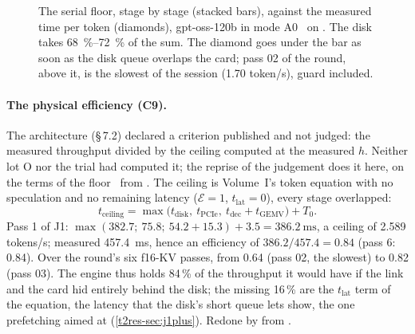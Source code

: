 \begin{figure}[ht]
\centering
\GrapheResPlancher
\caption[The serial floor, stage by stage]{The serial floor, stage by stage (stacked bars), against the measured time per token (diamonds), gpt-oss-120b in mode A0 \calc~on \mes. The disk takes \SIrange{68}{72}{\percent} of the sum. The diamond goes under the bar as soon as the disk queue overlaps the card; pass 02 of the round, above it, is the slowest of the session (\num{1.70} token/s), guard included.}
\label{t2res-fig:plancher}
\end{figure}

\paragraph{The physical efficiency (C9).}\label{t2res-sec:c9} The architecture (§\,7.2) declared a criterion published and not judged: the measured throughput divided by the ceiling computed at the measured $h$. Neither lot O nor the trial had computed it; the reprise of the judgement does it here, on the terms of the floor \calc~from \mes. The ceiling is Volume~I's token equation with no speculation and no remaining latency ($\mathcal E = 1$, $t_{\text{lat}} = 0$), every stage overlapped:
\[
t_{\text{ceiling}} = \max\big(t_{\text{disk}},\ t_{\text{PCIe}},\ t_{\text{dec}} + t_{\text{GEMV}}\big) + T_0 .
\]
Pass 1 of J1: $\max(382.7;\ 75.8;\ 54.2 + 15.3) + 3.5 = \SI{386.2}{\milli\second}$, a ceiling of \num{2.589} tokens/s; measured \SI{457.4}{\milli\second}, hence an efficiency of $386.2 / 457.4 = \mathbf{0.84}$ (pass 6: 0.84). Over the round's six f16-KV passes, from \num{0.64} (pass 02, the slowest) to \num{0.82} (pass 03). The engine thus holds 84\,\% of the throughput it would have if the link and the card hid entirely behind the disk; the missing 16\,\% are the $t_{\text{lat}}$ term of the equation, the latency that the disk's short queue lets show, the one prefetching aimed at (\cref{t2res-sec:j1plus}). Redone by  from .

